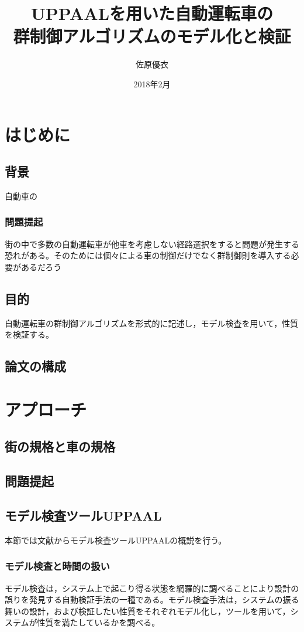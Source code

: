 \documentclass{tpu-sotu}
\title{UPPAALを用いた自動運転車の\\群制御アルゴリズムのモデル化と検証}
\author{佐原優衣}
\date{2018年2月}
\begin{document}
\maketitle
\clearpage
{}
\setcounter{tocdepth}{3}
\tableofcontents
\clearpage
{}

\chapter{はじめに}
	\section{背景}
	自動車の
		\subsection{問題提起}
		街の中で多数の自動運転車が他車を考慮しない経路選択をすると問題が発生する恐れがある。そのためには個々による車の制御だけでなく群制御則を導入する必要があるだろう
	\section{目的}
	自動運転車の群制御アルゴリズムを形式的に記述し，モデル検査を用いて，性質を検証する。
	\section{論文の構成}
\chapter{アプローチ}

	\section{街の規格と車の規格}
	\section{問題提起}
	\section{モデル検査ツールUPPAAL}
	本節では文献\cite{a1}からモデル検査ツールUPPAALの概説を行う。
	\subsection{モデル検査と時間の扱い}
	モデル検査は，システム上で起こり得る状態を網羅的に調べることにより設計の誤りを発見する自動検証手法の一種である。モデル検査手法は，システムの振る舞いの設計，および検証したい性質をそれぞれモデル化し，ツールを用いて，システムが性質を満たしているかを調べる。
\end{document}
